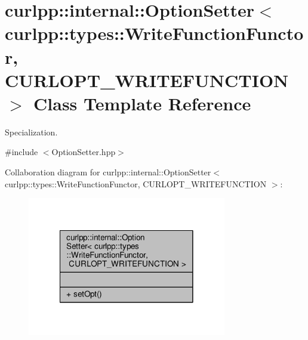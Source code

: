 \hypertarget{classcurlpp_1_1internal_1_1OptionSetter_3_01curlpp_1_1types_1_1WriteFunctionFunctor_00_01CURLOPT__WRITEFUNCTION_01_4}{\section{curlpp\-:\-:internal\-:\-:Option\-Setter$<$ curlpp\-:\-:types\-:\-:Write\-Function\-Functor, C\-U\-R\-L\-O\-P\-T\-\_\-\-W\-R\-I\-T\-E\-F\-U\-N\-C\-T\-I\-O\-N $>$ Class Template Reference}
\label{classcurlpp_1_1internal_1_1OptionSetter_3_01curlpp_1_1types_1_1WriteFunctionFunctor_00_01CURLOPT__WRITEFUNCTION_01_4}
}


Specialization.  




{\ttfamily \#include $<$Option\-Setter.\-hpp$>$}



Collaboration diagram for curlpp\-:\-:internal\-:\-:Option\-Setter$<$ curlpp\-:\-:types\-:\-:Write\-Function\-Functor, C\-U\-R\-L\-O\-P\-T\-\_\-\-W\-R\-I\-T\-E\-F\-U\-N\-C\-T\-I\-O\-N $>$\-:\nopagebreak
\begin{figure}[H]
\begin{center}
\leavevmode
\includegraphics[width=246pt]{classcurlpp_1_1internal_1_1OptionSetter_3_01curlpp_1_1types_1_1WriteFunctionFunctor_00_01CURLOPT7bc9d754129ea738b6fa38db0175fa4b}
\end{center}
\end{figure}
